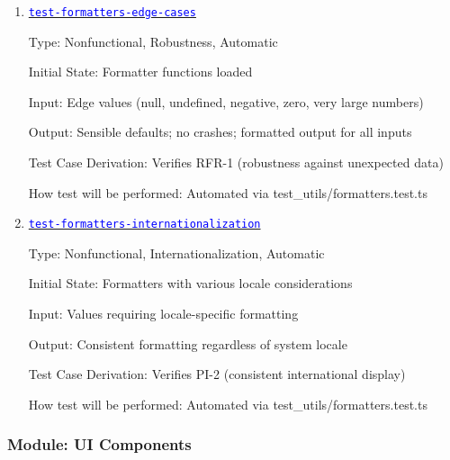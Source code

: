 \documentclass[12pt, titlepage]{article}
\newcommand{\tid}[1]{\hyperlink{tid:#1}{\textcolor{blue}{\texttt{#1}}}}
\begin{document}
\begin{enumerate}

  \item{\tid{test-formatters-edge-cases}\\}

        Type: Nonfunctional, Robustness, Automatic

        Initial State: Formatter functions loaded

        Input: Edge values (null, undefined, negative, zero, very large numbers)

        Output: Sensible defaults; no crashes; formatted output for all inputs

        Test Case Derivation: Verifies RFR-1 (robustness against unexpected data)

        How test will be performed: Automated via test\_utils/formatters.test.ts

  \item{\tid{test-formatters-internationalization}\\}

        Type: Nonfunctional, Internationalization, Automatic

        Initial State: Formatters with various locale considerations

        Input: Values requiring locale-specific formatting

        Output: Consistent formatting regardless of system locale

        Test Case Derivation: Verifies PI-2 (consistent international display)

        How test will be performed: Automated via test\_utils/formatters.test.ts

\end{enumerate}

\subsubsection{Module: UI Components}
\end{document}
